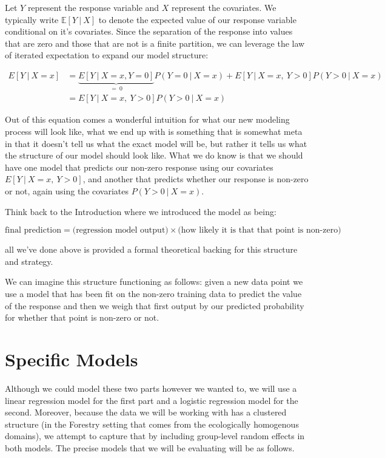 \documentclass[12pt,twoside]{reedthesis}
\begin{document}
Let \(Y\) represent the response variable and \(X\) represent the covariates. We typically write \(\mathbb{E}[Y \ | \ X]\) to denote the expected value of our response variable conditional on it's covariates. Since the separation of the response into values that are zero and those that are not is a finite partition, we can leverage the law of iterated expectation to expand our model structure:

\[
\begin{aligned}
    E[ Y  \ | \ X = x] &= \underbrace{E[Y \ | \ X = x, Y = 0]}_{= \ 0}P(Y = 0 \ | \ X = x) + E[Y \ | \ X = x, \ Y > 0]P(Y> 0 \ | \ X = x) \\
    &= E[Y \ | \ X = x, \ Y > 0]P(Y > 0 \ | \ X = x) 
\end{aligned}
\]

Out of this equation comes a wonderful intuition for what our new modeling process will look like, what we end up with is something that is somewhat meta in that it doesn't tell us what the exact model will be, but rather it tells us what the structure of our model should look like. What we do know is that we should have one model that predicts our non-zero response using our covariates \(E[Y \ | \ X = x, \ Y>0]\), and another that predicts whether our response is non-zero or not, again using the covariates \(P(Y > 0 \ | \ X = x)\).

Think back to the Introduction where we introduced the model as being:

\[
\text{final prediction} = \bigg(\text{regression model output}\bigg) \times \bigg(\text{how likely it is that that point is non-zero}\bigg)
\]

all we've done above is provided a formal theoretical backing for this structure and strategy.

We can imagine this structure functioning as follows: given a new data point we use a model that has been fit on the non-zero training data to predict the value of the response and then we weigh that first output by our predicted probability for whether that point is non-zero or not.

\hypertarget{specific-models}{%
\section{Specific Models}\label{specific-models}}

Although we could model these two parts however we wanted to, we will use a linear regression model for the first part and a logistic regression model for the second. Moreover, because the data we will be working with has a clustered structure (in the Forestry setting that comes from the ecologically homogenous domains), we attempt to capture that by including group-level random effects in both models. The precise models that we will be evaluating will be as follows.
\end{document}
